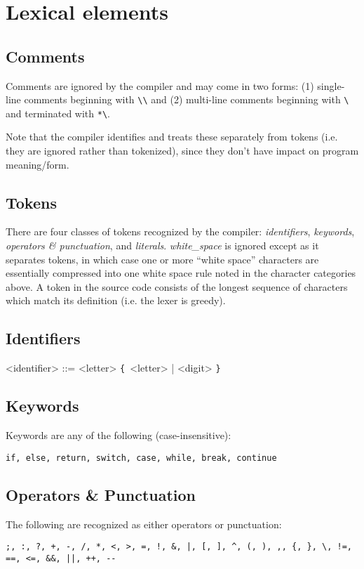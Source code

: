 \documentclass{article}
\def\lrep{\synshortsoff\texttt{\{}\synshorts~}
\def\rrep{\synshortsoff\texttt{\}}\synshorts~}
\begin{document}
\section*{Lexical elements}
\subsection*{Comments}
Comments are ignored by the compiler and may come in two forms: (1)
single-line comments beginning with
\texttt{\textbackslash\textbackslash} and (2) multi-line comments
beginning with \texttt{\textbackslash*} and terminated with
\texttt{*\textbackslash}.

Note that the compiler identifies and treats these separately from
tokens (i.e. they are ignored rather than tokenized), since they don't
have impact on program meaning/form.

\subsection*{Tokens}
There are four classes of tokens recognized by the compiler:
\emph{identifiers}, \emph{keywords}, \emph{operators \& punctuation},
and \emph{literals}. \emph{white\_space} is ignored except as it
separates tokens, in which case one or more ``white space'' characters
are essentially compressed into one white space rule noted in the
character categories above. A token in the source code consists of the
longest sequence of characters which match its definition (i.e. the
lexer is greedy).

\subsection*{Identifiers}
\begin{grammar}
  <identifier> ::= <letter> \lrep <letter> | <digit> \rrep
\end{grammar}

\subsection*{Keywords}
Keywords are any of the following (case-insensitive):
\begin{verbatim}
if, else, return, switch, case, while, break, continue
\end{verbatim}

\subsection*{Operators \& Punctuation}
The following are recognized as either operators or punctuation:
\begin{verbatim}
;, :, ?, +, -, /, *, <, >, =, !, &, |, [, ], ^, (, ), ,, {, }, \, !=, ==, <=, &&, ||, ++, --
\end{verbatim}
\end{document}
